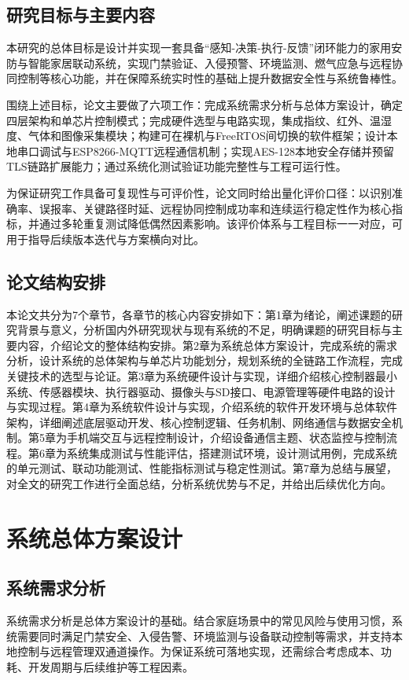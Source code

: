 \documentclass[UTF8,12pt,a4paper,oneside]{ctexbook}
\numberwithin{equation}{chapter}
\begin{document}
\section{研究目标与主要内容}
本研究的总体目标是设计并实现一套具备“感知-决策-执行-反馈”闭环能力的家用安防与智能家居联动系统，实现门禁验证、入侵预警、环境监测、燃气应急与远程协同控制等核心功能，并在保障系统实时性的基础上提升数据安全性与系统鲁棒性。

围绕上述目标，论文主要做了六项工作：完成系统需求分析与总体方案设计，确定四层架构和单芯片控制模式；完成硬件选型与电路实现，集成指纹、红外、温湿度、气体和图像采集模块；构建可在裸机与FreeRTOS间切换的软件框架；设计本地串口调试与ESP8266-MQTT远程通信机制；实现AES-128本地安全存储并预留TLS链路扩展能力；通过系统化测试验证功能完整性与工程可运行性。

为保证研究工作具备可复现性与可评价性，论文同时给出量化评价口径：以识别准确率、误报率、关键路径时延、远程协同控制成功率和连续运行稳定性作为核心指标，并通过多轮重复测试降低偶然因素影响。该评价体系与工程目标一一对应，可用于指导后续版本迭代与方案横向对比。
\section{论文结构安排}
本论文共分为7个章节，各章节的核心内容安排如下：第1章为绪论，阐述课题的研究背景与意义，分析国内外研究现状与现有系统的不足，明确课题的研究目标与主要内容，介绍论文的整体结构安排。第2章为系统总体方案设计，完成系统的需求分析，设计系统的总体架构与单芯片功能划分，规划系统的全链路工作流程，完成关键技术的选型与论证。第3章为系统硬件设计与实现，详细介绍核心控制器最小系统、传感器模块、执行器驱动、摄像头与SD接口、电源管理等硬件电路的设计与实现过程。第4章为系统软件设计与实现，介绍系统的软件开发环境与总体软件架构，详细阐述底层驱动开发、核心控制逻辑、任务机制、网络通信与数据安全机制。第5章为手机端交互与远程控制设计，介绍设备通信主题、状态监控与控制流程。第6章为系统集成测试与性能评估，搭建测试环境，设计测试用例，完成系统的单元测试、联动功能测试、性能指标测试与稳定性测试。第7章为总结与展望，对全文的研究工作进行全面总结，分析系统优势与不足，并给出后续优化方向。

\chapter{系统总体方案设计}
\section{系统需求分析}
系统需求分析是总体方案设计的基础。结合家庭场景中的常见风险与使用习惯，系统需要同时满足门禁安全、入侵告警、环境监测与设备联动控制等需求，并支持本地控制与远程管理双通道操作。为保证系统可落地实现，还需综合考虑成本、功耗、开发周期与后续维护等工程因素。
\end{document}
